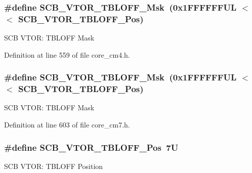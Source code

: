 \subsubsection[{\texorpdfstring{S\+C\+B\+\_\+\+V\+T\+O\+R\+\_\+\+T\+B\+L\+O\+F\+F\+\_\+\+Msk}{SCB_VTOR_TBLOFF_Msk}}]{\setlength{\rightskip}{0pt plus 5cm}\#define S\+C\+B\+\_\+\+V\+T\+O\+R\+\_\+\+T\+B\+L\+O\+F\+F\+\_\+\+Msk~(0x1\+F\+F\+F\+F\+F\+F\+U\+L $<$$<$ S\+C\+B\+\_\+\+V\+T\+O\+R\+\_\+\+T\+B\+L\+O\+F\+F\+\_\+\+Pos)}\hypertarget{group___c_m_s_i_s___s_c_b_ga75e395ed74042923e8c93edf50f0996c}{}\label{group___c_m_s_i_s___s_c_b_ga75e395ed74042923e8c93edf50f0996c}
S\+CB V\+T\+OR\+: T\+B\+L\+O\+FF Mask 

Definition at line 559 of file core\+\_\+cm4.\+h.

\subsubsection[{\texorpdfstring{S\+C\+B\+\_\+\+V\+T\+O\+R\+\_\+\+T\+B\+L\+O\+F\+F\+\_\+\+Msk}{SCB_VTOR_TBLOFF_Msk}}]{\setlength{\rightskip}{0pt plus 5cm}\#define S\+C\+B\+\_\+\+V\+T\+O\+R\+\_\+\+T\+B\+L\+O\+F\+F\+\_\+\+Msk~(0x1\+F\+F\+F\+F\+F\+F\+U\+L $<$$<$ S\+C\+B\+\_\+\+V\+T\+O\+R\+\_\+\+T\+B\+L\+O\+F\+F\+\_\+\+Pos)}\hypertarget{group___c_m_s_i_s___s_c_b_ga75e395ed74042923e8c93edf50f0996c}{}\label{group___c_m_s_i_s___s_c_b_ga75e395ed74042923e8c93edf50f0996c}
S\+CB V\+T\+OR\+: T\+B\+L\+O\+FF Mask 

Definition at line 603 of file core\+\_\+cm7.\+h.

\subsubsection[{\texorpdfstring{S\+C\+B\+\_\+\+V\+T\+O\+R\+\_\+\+T\+B\+L\+O\+F\+F\+\_\+\+Pos}{SCB_VTOR_TBLOFF_Pos}}]{\setlength{\rightskip}{0pt plus 5cm}\#define S\+C\+B\+\_\+\+V\+T\+O\+R\+\_\+\+T\+B\+L\+O\+F\+F\+\_\+\+Pos~7U}\hypertarget{group___c_m_s_i_s___s_c_b_gac6a55451ddd38bffcff5a211d29cea78}{}\label{group___c_m_s_i_s___s_c_b_gac6a55451ddd38bffcff5a211d29cea78}
S\+CB V\+T\+OR\+: T\+B\+L\+O\+FF Position 

